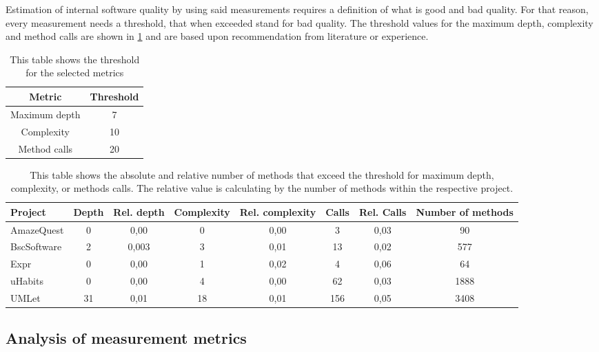 \documentclass[conference]{IEEEtran}
\begin{document}
Estimation of internal software quality by using said measurements requires a definition of what is good and bad quality. For that reason, every measurement needs a threshold, that when exceeded stand for bad quality. The threshold values for the maximum depth, complexity and method calls are shown in \cref{tbl:thresholds} and are based upon recommendation from literature or experience.
\begin{table}
\centering
    \begin{tabular}{c c}
         Metric         & Threshold    \\ \hline
         Maximum depth  & 7             \\
         Complexity     & 10            \\
         Method calls   & 20            \\
    \end{tabular}
    \caption{This table shows the threshold for the selected metrics}
    \label{tbl:thresholds}
\end{table}

\begin{table}
\centering
\begin{tabular}{l|c c c c c c c}
	Project     & Depth & Rel. depth & Complexity & Rel. complexity & Calls & Rel. Calls & Number of methods \\ \hline
	AmazeQuest  &   0   & 0,00       & 0          & 0,00            & 3     & 0,03       & 90                \\
	BscSoftware &   2   & 0,003      & 3          & 0,01            & 13    & 0,02       & 577               \\
	Expr        &   0   & 0,00       & 1          & 0,02            & 4     & 0,06       & 64                \\
	uHabits     &   0   & 0,00       & 4          & 0,00            & 62    & 0,03       & 1888              \\
	UMLet       &  31   & 0,01       & 18         & 0,01            & 156   & 0,05       & 3408
\end{tabular} 
\caption{This table shows the absolute and relative number of methods that exceed the threshold for maximum depth, complexity, or methods calls. The relative value is calculating by the number of methods within the respective project.}
\label{tbl:exceed}
\end{table}

\subsection{Analysis of measurement metrics}
\end{document}
